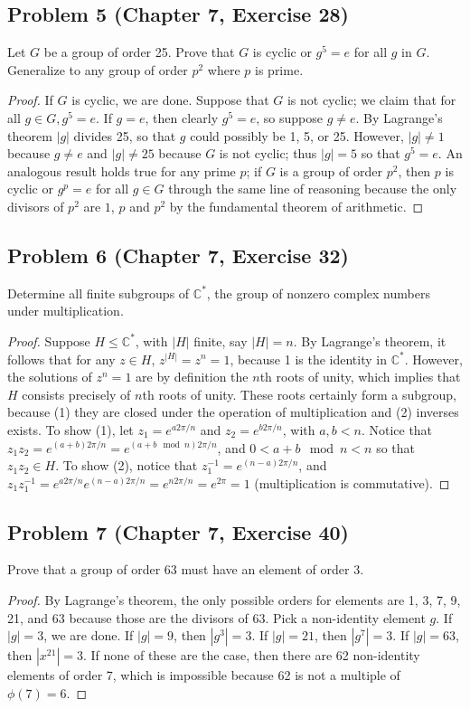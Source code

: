 \documentclass{article}
\begin{document}
\subsection*{Problem 5 (Chapter 7, Exercise 28)}
Let $G$ be a group of order 25. Prove that $G$ is cyclic or $g^5 = e$ for all $g$ in $G$. Generalize to any group of order $p^2$ where $p$ is prime.
\begin{proof}
If $G$ is cyclic, we are done. Suppose that $G$ is not cyclic; we claim that for all $g \in G, g^5 = e$. If $g = e$, then clearly $g^5 = e$, so suppose $g \neq e$. By Lagrange's theorem $|g|$ divides 25, so that $g$ could possibly be 1, 5, or 25. However, $|g| \neq 1$ because $g \neq e$ and $|g| \neq 25$ because $G$ is not cyclic; thus $|g| = 5$ so that $g^5 = e$. An analogous result holds true for any prime $p$; if $G$ is a group of order $p^2$, then $p$ is cyclic or $g^p = e$ for all $g \in G$ through the same line of reasoning because the only divisors of $p^2$ are $1$, $p$ and $p^2$ by the fundamental theorem of arithmetic.
\end{proof}


\subsection*{Problem 6 (Chapter 7, Exercise 32)}
Determine all finite subgroups of $\mathbb{C}^*$, the group of nonzero complex numbers under multiplication.
\begin{proof}
Suppose $H \leq \mathbb{C}^*$, with $|H|$ finite, say $|H| = n$. By Lagrange's theorem, it follows that for any $z \in H$, $z^{|H|} = z^n = 1$, because 1 is the identity in $\mathbb{C}^*$. However, the solutions of $z^n = 1$ are by definition the $n$th roots of unity, which implies that $H$ consists precisely of $n$th roots of unity. These roots certainly form a subgroup, because (1) they are closed under the operation of multiplication and (2) inverses exists. To show (1), let $z_1 = e^{a2\pi/n}$ and $z_2 = e^{b2\pi/n}$, with $a, b < n$. Notice that $z_1z_2 = e^{(a+b)2\pi/n} = e^{(a+b \mod{n})2\pi/n}$, and $0 < a+b \mod{n} < n$ so that $z_1z_2 \in H$. To show (2), notice that $z_1^{-1} = e^{(n-a)2\pi/n}$, and $z_1z_1^{-1} = e^{a2\pi/n}e^{(n-a)2\pi/n} = e^{n2\pi/n} = e^{2\pi} = 1$ (multiplication is commutative).
\end{proof}

\subsection*{Problem 7 (Chapter 7, Exercise 40)}
Prove that a group of order 63 must have an element of order 3.
\begin{proof}
By Lagrange's theorem, the only possible orders for elements are 1, 3, 7, 9, 21, and 63 because those are the divisors of 63. Pick a non-identity element $g$. If $|g| = 3$, we are done. If $|g| = 9$, then $|g^3| = 3$. If $|g| = 21$, then $|g^7| = 3$. If $|g| = 63$, then $|x^21| = 3$. If none of these are the case, then there are 62 non-identity elements of order 7, which is impossible because 62 is not a multiple of $\phi(7) = 6$.
\end{proof}
\end{document}
